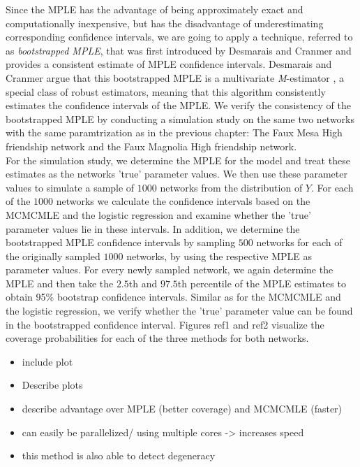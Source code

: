 \documentclass[headsepline=true, abstracton]{scrartcl}
\begin{document}
Since the MPLE has the advantage of being approximately exact and computationally inexpensive, but has the disadvantage of underestimating corresponding confidence intervals, we are going to apply a technique, referred to as \textit{bootstrapped MPLE}, that was first introduced by Desmarais and Cranmer \cite{Desmarais.2012} and provides a consistent estimate of MPLE confidence intervals. Desmarais and Cranmer argue that this bootstrapped MPLE is a multivariate \textit{M}-estimator \cite{Huber1981}, a special class of robust estimators, meaning that this algorithm consistently estimates the confidence intervals of the MPLE.
We verify the consistency of the bootstrapped MPLE by conducting a simulation study on the same two networks with the same paramtrization as in the previous chapter: The Faux Mesa High friendship network and the Faux Magnolia High friendship network. \\[0.3cm]
For the simulation study, we determine the MPLE for the model and treat these estimates as the networks 'true' parameter values. We then use these parameter values to simulate a sample of $1000$ networks from the distribution of $Y$. For each of the $1000$ networks we calculate the confidence intervals based on the MCMCMLE and the logistic regression and examine whether the 'true' parameter values lie in these intervals. In addition, we determine the bootstrapped MPLE confidence intervals by sampling $500$ networks for each of the originally sampled $1000$ networks, by using the respective MPLE as parameter values. For every newly sampled network, we again determine the MPLE and then take the $2.5$th and $97.5$th percentile of the MPLE estimates to obtain 95\% bootstrap confidence intervals. Similar as for the MCMCMLE and the logistic regression, we verify whether the 'true' parameter value can be found in the bootstrapped confidence interval. Figures ref1 and ref2 visualize the coverage probabilities for each of the three methods for both networks.


\begin{itemize}

\item include plot
\item Describe plots
\item describe advantage over MPLE (better coverage) and MCMCMLE (faster)
\item can easily be parallelized/ using multiple cores -> increases speed
\item this method is also able to detect degeneracy

\end{itemize}
\end{document}
